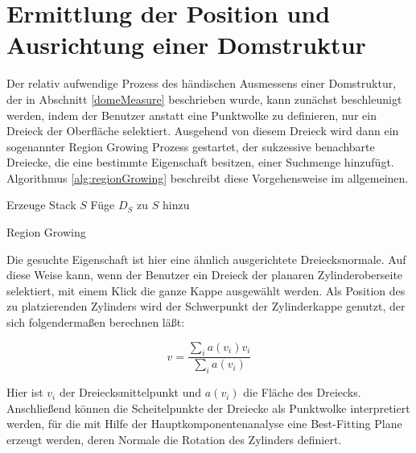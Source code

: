 \section{Ermittlung der Position und Ausrichtung einer Domstruktur}
\label{posTrafo}

Der relativ aufwendige Prozess des h\"andischen Ausmessens einer Domstruktur, der in Abschnitt \ref{domeMeasure} beschrieben wurde, kann zun\"achst beschleunigt werden, indem der Benutzer anstatt eine Punktwolke zu definieren, nur ein Dreieck der Oberfläche selektiert. Ausgehend von diesem Dreieck wird dann ein sogenannter Region Growing Prozess gestartet, der sukzessive benachbarte Dreiecke, die eine bestimmte Eigenschaft besitzen, einer Suchmenge hinzuf\"ugt.
Algorithmus \ref{alg:regionGrowing} beschreibt diese Vorgehensweise im allgemeinen.

\begin{algorithm}[H]
 \SetLine %
 Erzeuge Stack $S$\;
 Füge $D_{S}$ zu $S$ hinzu\;
 \caption{Region Growing}
 \label{alg:regionGrowing}
\end{algorithm}

Die gesuchte Eigenschaft ist hier eine \"ahnlich ausgerichtete Dreiecksnormale. Auf diese Weise kann, wenn der Benutzer ein Dreieck der planaren Zylinderoberseite selektiert, mit einem Klick die ganze Kappe ausgew\"ahlt werden.
Als Position des zu platzierenden Zylinders wird der Schwerpunkt der Zylinderkappe genutzt, der sich folgenderma{\ss}en berechnen l\"a{\ss}t:

\begin{equation}
v=\frac{\sum_{i}  a(v_{i})v_{i}}{\sum_{i}  a(v_{i})}
\end{equation}

Hier ist $v_{i}$ der Dreiecksmittelpunkt und  $a(v_{i})$ die Fläche des Dreiecks. Anschlie{\ss}end können die Scheitelpunkte der Dreiecke als Punktwolke interpretiert werden, f\"ur die mit Hilfe der Hauptkomponentenanalyse eine Best-Fitting Plane erzeugt werden, deren Normale die Rotation des Zylinders definiert. 


